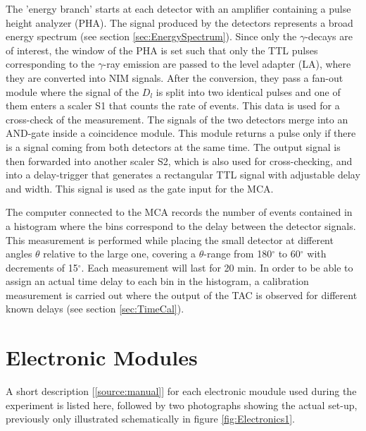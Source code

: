 \documentclass[a4paper,parskip,11pt, DIV12]{scrreprt}
\begin{document}
 The 'energy branch' starts at each detector with an amplifier containing a pulse height analyzer (PHA). The signal produced by the detectors represents a broad energy spectrum (see section \ref{sec:EnergySpectrum}). Since only the $\gamma$-decays are of interest, the window of the PHA is set such that only the TTL pulses corresponding to the $\gamma$-ray emission are passed to the level adapter (LA), where they are converted into NIM signals. After the conversion, they pass a fan-out module where the signal of the $D_l$ is split into two identical pulses and one of them enters a scaler S1 that counts the rate of events. This data is used for a cross-check of the measurement. The signals of the two detectors merge into an AND-gate inside a coincidence module. This module returns a pulse only if there is a signal coming from both detectors at the same time. The output signal is then forwarded into another scaler S2, which is also used for cross-checking, and into a delay-trigger that generates a rectangular TTL signal with adjustable delay and width. This signal is used as the gate input for the MCA.

The computer connected to the MCA records the number of events contained in a histogram where the bins correspond to the delay between the detector signals. This measurement is performed while placing the small detector at different angles $\theta$ relative to the large one, covering a $\theta$-range from 180$^\circ$ to 60$^\circ$ with decrements of 15$^\circ$. Each measurement will last for 20 min. In order to be able to assign an actual time delay to each bin in the histogram, a calibration measurement is carried out where the output of the TAC is observed for different known delays (see section \ref{sec:TimeCal}). 


\section{Electronic Modules} \label{sec:modules}

A short description [\ref{source:manual}] for each electronic moudule used during the experiment is listed here, followed by two photographs showing the actual set-up, previously only illustrated schematically in figure \ref{fig:Electronics1}.
\end{document}
